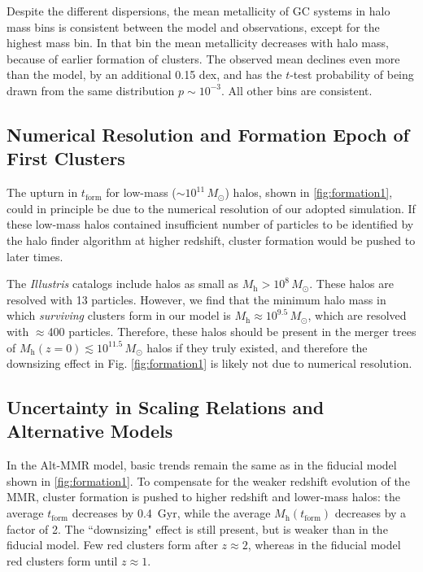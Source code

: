 \documentclass[fleqn,usenatbib]{mnras}
\newcommand{\Mh}{M_{\mathrm{h}}}
\newcommand{\Msun}{\,M_{\odot}}
\newcommand{\tform}{t_{\mathrm{form}}}
\begin{document}
Despite the different dispersions, the mean metallicity of GC systems in halo mass bins is consistent between the model and observations, except for the highest mass bin. In that bin the mean metallicity decreases with halo mass, because of earlier formation of clusters. The observed mean declines even more than the model, by an additional 0.15 dex, and has the $t$-test probability of being drawn from the same distribution $p\sim 10^{-3}$. All other bins are consistent. 

\subsection{Numerical Resolution and Formation Epoch of First Clusters}

The upturn in $\tform$ for low-mass ($\sim 10^{11}\Msun$) halos, shown in \autoref{fig:formation1}, could in principle be due to the numerical resolution of our adopted simulation. If these low-mass halos contained insufficient number of particles to be identified by the halo finder algorithm at higher redshift, cluster formation would be pushed to later times.
 
The \textit{Illustris} catalogs include halos as small as $\Mh > 10^{8}\Msun$. These halos are resolved with 13 particles. However, we find that the minimum halo mass in which \textit{surviving} clusters form in our model is $\Mh \approx 10^{9.5} \Msun$, which are resolved with $\approx$400 particles. Therefore, these halos should be present in the merger trees of $\Mh(z=0) \lesssim 10^{11.5} \Msun$ halos if they truly existed, and therefore the downsizing effect in Fig. \ref{fig:formation1} is likely not due to numerical resolution.

\subsection{Uncertainty in Scaling Relations and Alternative Models}
\label{sec:alt_discussion}

In the Alt-MMR model, basic trends remain the same as in the fiducial model shown in \autoref{fig:formation1}. To compensate for the weaker redshift evolution of the MMR, cluster formation is pushed to higher redshift and lower-mass halos: the average $\tform$ decreases by 0.4~Gyr, while the average $\Mh(\tform)$ decreases by a factor of 2. The ``downsizing" effect is still present, but is weaker than in the fiducial model. Few red clusters form after $z \approx 2$, whereas in the fiducial model red clusters form until $z \approx 1$.
\end{document}
